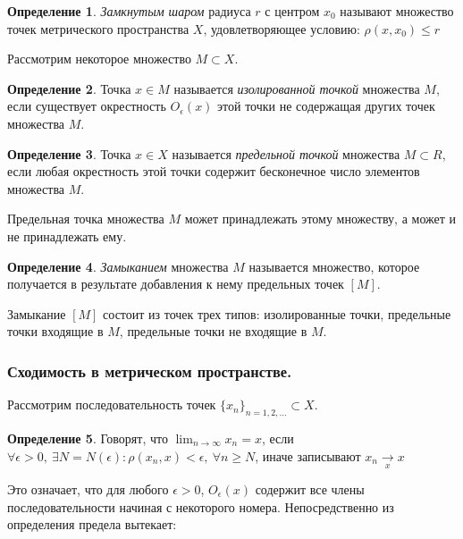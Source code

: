 \documentclass[14pt,a4paper]{extarticle}
\theoremstyle{definition}
\newtheorem{definition}{Определение}[section]
\theoremstyle{remark}
\renewcommand{\[}{\begin{dmath*}[compact]}
\renewcommand{\]}{\end{dmath*}}
\newcommand{\ds}{\displaystyle}
\newcommand{\sep}{ , \ \allowbreak }
\begin{document}
\begin{definition}
  \textit{Замкнутым шаром} радиуса $r$ с центром $x_0$ называют множество точек
  метрического пространства $X$,
  удовлетворяющее условию: $\rho(x, x_0) \leq r$
\end{definition}

Рассмотрим некоторое множество $M \subset X$.

\begin{definition}
  Точка $x \in M$ называется \textit{изолированной точкой} множества $M$,
  если существует окрестность $O_\epsilon(x)$
  этой точки не содержащая других точек множества $M$.
\end{definition}

\begin{definition}
  Точка $x \in X$ называется \textit{предельной точкой} множества $M \subset R$,
  если любая окрестность этой точки содержит бесконечное число
  элементов множества $M$.
\end{definition}

Предельная точка множества $M$ может принадлежать этому множеству, а может
и не принадлежать ему.

\begin{definition}
  \textit{Замыканием} множества $M$ называется множество,
  которое получается в результате добавления к нему предельных точек $[M]$.
\end{definition}

Замыкание $[M]$ состоит из точек трех типов: изолированные точки, предельные
точки входящие в $M$, предельные точки не входящие в $M$.

\subsubsection{Сходимость в метрическом пространстве.}

Рассмотрим последовательность точек $\{x_n\}_{n=1,2,\dots}\subset X$.

\begin{definition}
  Говорят, что $\ds\lim_{n \to \infty} x_n = x$, если
  $\forall \epsilon > 0 \sep \exists N = N(\epsilon): \rho(x_n, x)<\epsilon \sep
  \forall n \geq N$, иначе записывают $x_n \underset{x}{\to} x$
\end{definition}

Это означает, что для любого $\epsilon > 0$, $O_\epsilon(x)$ содержит все
члены последовательности начиная с некоторого номера. Непосредственно из
определения предела вытекает:
\end{document}
